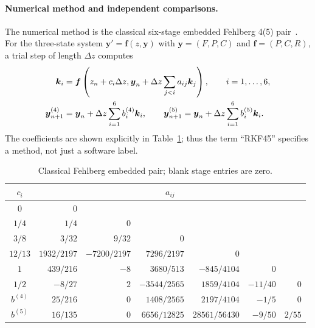 \paragraph{Numerical method and independent comparisons.}
The numerical method is the classical six-stage embedded Fehlberg
4(5) pair~\cite{uddin2016rkf}. For the three-state system
$\boldsymbol y'=\boldsymbol f(z,\boldsymbol y)$ with
$\boldsymbol y=(F,P,C)$ and $\boldsymbol f=(P,C,R)$, a trial step
of length $\Delta z$ computes
\begin{align}
 \boldsymbol k_i&=\boldsymbol f\left(z_n+c_i\Delta z,
       \boldsymbol y_n+\Delta z\sum_{j<i}a_{ij}\boldsymbol k_j\right),
             \qquad i=1,\ldots,6,\notag\\
 \boldsymbol y_{n+1}^{(4)}&=\boldsymbol y_n+
                  \Delta z\sum_{i=1}^6b_i^{(4)}\boldsymbol k_i,\qquad
 \boldsymbol y_{n+1}^{(5)}=\boldsymbol y_n+
                  \Delta z\sum_{i=1}^6b_i^{(5)}\boldsymbol k_i.
 \label{eq:sve-rkf-step}
\end{align}
The coefficients are shown explicitly in Table~\ref{tab:sve-rkf-tableau};
thus the term ``RKF45'' specifies a method, not just a software label.

\begin{table}[htbp]
\centering\small
\begin{tabular}{@{}c|rrrrrr@{}}
\toprule
$c_i$ & \multicolumn{6}{c}{$a_{ij}$}\\
\midrule
$0$ & $0$ & & & & &\\
$1/4$ & $1/4$ & $0$ & & & &\\
$3/8$ & $3/32$ & $9/32$ & $0$ & & &\\
$12/13$ & $1932/2197$ & $-7200/2197$ & $7296/2197$ & $0$ & &\\
$1$ & $439/216$ & $-8$ & $3680/513$ & $-845/4104$ & $0$ &\\
$1/2$ & $-8/27$ & $2$ & $-3544/2565$ & $1859/4104$ & $-11/40$ & $0$\\
\midrule
$b^{(4)}$ & $25/216$ & $0$ & $1408/2565$ & $2197/4104$ & $-1/5$ & $0$\\
$b^{(5)}$ & $16/135$ & $0$ & $6656/12825$ & $28561/56430$ & $-9/50$ & $2/55$\\
\bottomrule
\end{tabular}
\caption{Classical Fehlberg embedded pair; blank stage entries are zero.}
\label{tab:sve-rkf-tableau}
\end{table}

